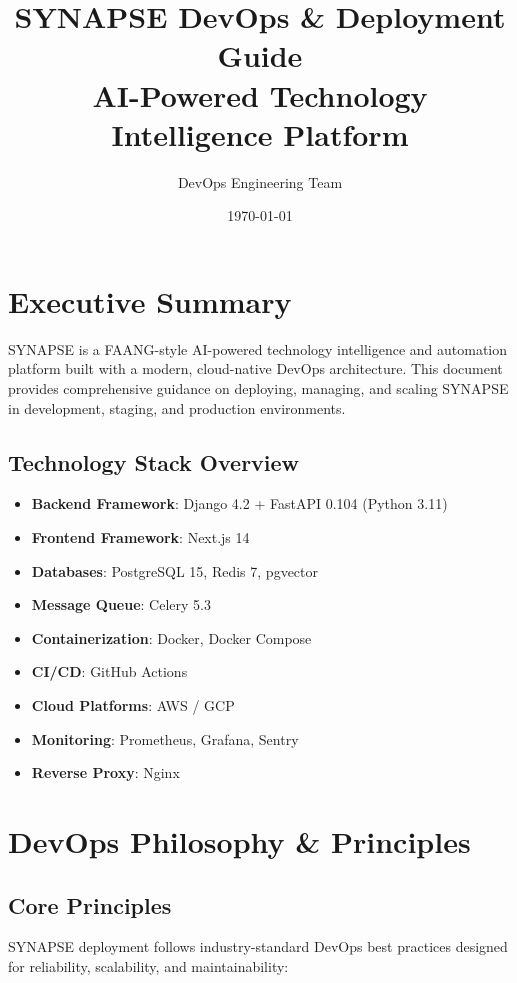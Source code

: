 \documentclass{report}
\title{\textbf{SYNAPSE DevOps \& Deployment Guide} \\ AI-Powered Technology Intelligence Platform}
\author{DevOps Engineering Team}
\date{\today}
\begin{document}
\maketitle

\tableofcontents
\newpage

\chapter{Executive Summary}

SYNAPSE is a FAANG-style AI-powered technology intelligence and automation platform built with a modern, cloud-native DevOps architecture. This document provides comprehensive guidance on deploying, managing, and scaling SYNAPSE in development, staging, and production environments.

\section{Technology Stack Overview}

\begin{itemize}
  \item \textbf{Backend Framework}: Django 4.2 + FastAPI 0.104 (Python 3.11)
  \item \textbf{Frontend Framework}: Next.js 14
  \item \textbf{Databases}: PostgreSQL 15, Redis 7, pgvector
  \item \textbf{Message Queue}: Celery 5.3
  \item \textbf{Containerization}: Docker, Docker Compose
  \item \textbf{CI/CD}: GitHub Actions
  \item \textbf{Cloud Platforms}: AWS / GCP
  \item \textbf{Monitoring}: Prometheus, Grafana, Sentry
  \item \textbf{Reverse Proxy}: Nginx
\end{itemize}

\chapter{DevOps Philosophy \& Principles}

\section{Core Principles}

SYNAPSE deployment follows industry-standard DevOps best practices designed for reliability, scalability, and maintainability:
\end{document}

